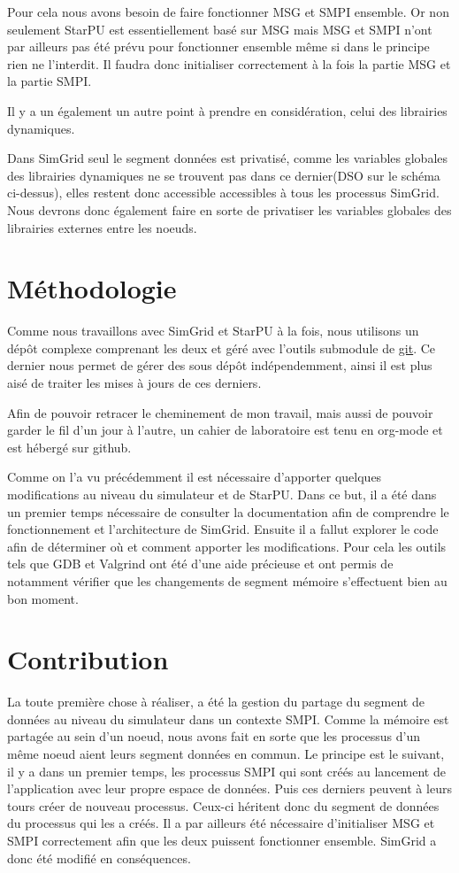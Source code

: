 \documentclass[smallextended]{svjour3}
\begin{document}
Pour cela nous avons besoin de faire fonctionner MSG et SMPI
ensemble. Or non seulement StarPU est essentiellement basé sur MSG
mais MSG et SMPI n'ont par ailleurs pas été prévu pour fonctionner
ensemble même si dans le principe rien ne l'interdit. Il
faudra donc initialiser correctement à la fois la partie MSG et la
partie SMPI.  

Il y a un également un autre point à prendre en considération,
celui des librairies dynamiques. 

Dans SimGrid seul le segment données est privatisé, comme les
variables globales des librairies dynamiques ne se trouvent pas
dans ce dernier(DSO sur le schéma ci-dessus), elles restent donc
accessible accessibles à tous les processus SimGrid. Nous devrons donc
également faire en sorte de privatiser les variables globales des
librairies externes entre les noeuds. 

\section{Méthodologie}
\label{sec-4}
Comme nous travaillons avec SimGrid et StarPU à la fois, nous
utilisons un dépôt complexe comprenant les deux et géré avec
l'outils submodule de \href{https://github.com/swhatelse/Journal}{git}. Ce dernier nous permet de gérer des sous
dépôt indépendemment, ainsi il est plus aisé de traiter les mises à
jours de ces derniers.

Afin de pouvoir retracer le cheminement de mon travail, mais aussi
de pouvoir garder le fil d'un jour à l'autre, un cahier de
laboratoire est tenu en org-mode et est hébergé sur github.

Comme on l'a vu précédemment il est nécessaire d'apporter quelques
modifications au niveau du simulateur et de StarPU. Dans ce but, il
a été dans un premier temps nécessaire de consulter la documentation
afin de comprendre le fonctionnement et l'architecture de
SimGrid. Ensuite il a fallut explorer le code afin de déterminer où
et comment apporter les modifications. Pour cela les outils tels que
GDB et Valgrind ont été d'une aide précieuse et ont permis de notamment
vérifier que les changements de segment mémoire s'effectuent bien au
bon moment.

\section{Contribution}
\label{sec-5}
La toute première chose à réaliser, a été la gestion du partage du
segment de données au niveau du simulateur dans un contexte
SMPI. Comme la mémoire est partagée au sein d'un noeud, nous avons
fait en sorte que les processus d'un même noeud aient leurs segment
données en commun. Le principe est le suivant, il y a dans un
premier temps, les processus SMPI qui sont créés au lancement de
l'application avec leur propre espace de données. Puis ces derniers
peuvent à leurs tours créer de nouveau processus. Ceux-ci héritent
donc du segment de données du processus qui les a créés. Il a par
ailleurs été nécessaire d'initialiser MSG et SMPI
correctement afin que les deux puissent fonctionner
ensemble. SimGrid a donc été modifié en conséquences. 
\end{document}
